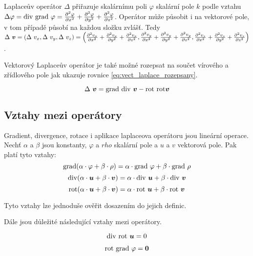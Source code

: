 Laplaceův operátor \(\Delta\) přiřazuje skalárnímu poli \(\varphi\) skalární pole \(k\) podle vztahu \(\Delta \varphi = \mathrm{div} \ \mathrm{grad} \ \varphi = \frac{\partial^2 \varphi}{\partial x^2} + \frac{\partial^2 \varphi}{\partial y^2} + \frac{\partial^2 \varphi}{\partial z^2}\). Operátor může působit i na vektorové pole, v tom případě působí na každou složku zvlášť. Tedy \(\Delta \ \vect{v} = \left(\Delta \ v_x, \Delta \ v_y, \Delta \ v_z \right) = \left(\frac{\partial^2 v_x}{\partial x^2} + \frac{\partial^2 v_x}{\partial y^2} + \frac{\partial^2 v_x}{\partial z^2},
\frac{\partial^2 v_y}{\partial x^2} + \frac{\partial^2 v_y}{\partial y^2} + \frac{\partial^2 v_y}{\partial z^2},
\frac{\partial^2 v_z}{\partial x^2} + \frac{\partial^2 v_z}{\partial y^2} + \frac{\partial^2 v_z}{\partial z^2} \right)\).

Vektorový Laplaceův operátor je také možné rozepsat na součet vírového a zřídlového pole jak ukazuje rovnice \eqref{eq:vect_laplace_rozepsany}.

\begin{equation}
\label{eq:vect_laplace_rozepsany}
\Delta \ \boldsymbol{v} = \mathrm{grad} \ \mathrm{div} \ \boldsymbol{v} - \mathrm{rot} \ \mathrm{rot} \boldsymbol{v} 
\end{equation}

\subsection{Vztahy mezi operátory}

Gradient, divergence, rotace i aplikace laplaceova operátoru jsou lineární operace. Nechť \(\alpha\) a \(\beta\) jsou konstanty, \(\varphi\) a \(rho\) skalární pole a \(u\) a \(v\) vektorová pole. Pak platí tyto vztahy:
\[
\mathrm{grad}(\alpha \cdot \varphi + \beta \cdot \rho) = \alpha \cdot \mathrm{grad} \ \varphi + \beta \cdot \mathrm{grad} \ \rho
\]
\[
\diverg(\alpha \cdot \vect{u} + \beta \cdot \vect{v}) = \alpha \cdot \diverg \ \vect{u} + \beta \cdot \diverg \ \vect{v}
\]
\[
\mathrm{rot}(\alpha \cdot \boldsymbol{u} + \beta \cdot \boldsymbol{v}) = \alpha \cdot \mathrm{rot} \ \boldsymbol{u} + \beta \cdot \mathrm{rot} \ \boldsymbol{v}
\]

Tyto vztahy lze jednoduše ověřit dosazením do jejich definic.

Dále jsou důležité následující vztahy mezi operátory.

\begin{equation}
\label{eq:div_rot}
\mathrm{div} \ \mathrm{rot} \ \boldsymbol{u} = 0
\end{equation}

\begin{equation}
\label{eq:rot_grad}
\mathrm{rot} \ \mathrm{grad} \ \varphi = \boldsymbol{0}
\end{equation}

